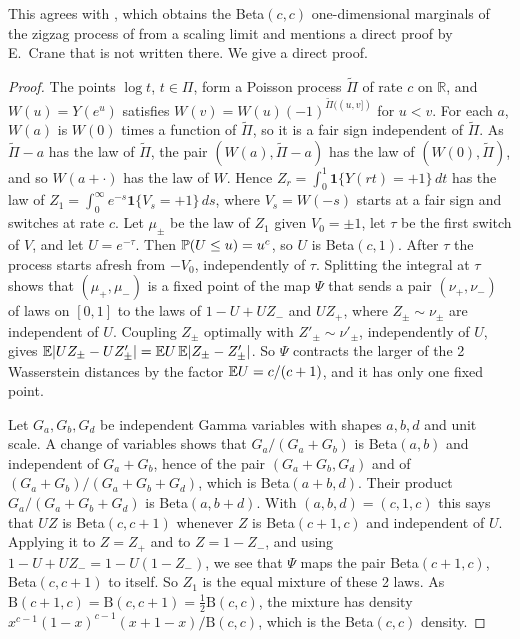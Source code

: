 This agrees with \cite[Remark~6.2]{evw2020}, which obtains the Beta$(c,c)$ one-dimensional
marginals of the zigzag process of \cite[Definition~6.1]{evw2020} from a scaling limit and
mentions a direct proof by E.~Crane that is not written there. We give a direct proof.

\begin{proof}
The points $\log t$, $t\in\Pi$, form a Poisson process $\tilde\Pi$ of rate $c$ on $\mathbb R$,
and $W(u)=Y(e^u)$ satisfies $W(v)=W(u)(-1)^{\tilde\Pi((u,v])}$ for $u<v$. For each $a$, $W(a)$
is $W(0)$ times a function of $\tilde\Pi$, so it is a fair sign independent of $\tilde\Pi$. As
$\tilde\Pi-a$ has the law of $\tilde\Pi$, the pair $(W(a),\tilde\Pi-a)$ has the law of
$(W(0),\tilde\Pi)$, and so $W(a+\cdot)$ has the law of $W$. Hence
$Z_r=\int_0^1\mathbf 1\{Y(rt)=+1\}\,dt$ has the law of
$Z_1=\int_0^\infty e^{-s}\mathbf 1\{V_s=+1\}\,ds$, where $V_s=W(-s)$ starts at a fair sign and
switches at rate $c$. Let $\mu_\pm$ be the law of $Z_1$ given $V_0=\pm1$, let $\tau$ be the
first switch of $V$, and let $U=e^{-\tau}$. Then $\mathbb{P}(U\le u)=u^c$, so $U$ is Beta$(c,1)$.
After $\tau$ the process starts afresh from $-V_0$, independently of $\tau$. Splitting the
integral at $\tau$ shows that $(\mu_+,\mu_-)$ is a fixed point of the map $\Psi$ that sends a
pair $(\nu_+,\nu_-)$ of laws on $[0,1]$ to the laws of $1-U+UZ_-$ and $UZ_+$, where
$Z_\pm\sim\nu_\pm$ are independent of $U$. Coupling $Z_\pm$ optimally with $Z'_\pm\sim\nu'_\pm$,
independently of $U$, gives $\mathbb{E}|UZ_\pm-UZ'_\pm|=\mathbb{E} U\,\mathbb{E}|Z_\pm-Z'_\pm|$. So $\Psi$ contracts the
larger of the 2 Wasserstein distances by the factor $\mathbb{E} U=c/(c+1)$, and it has only one fixed
point.

Let $G_a,G_b,G_d$ be independent Gamma variables with shapes $a,b,d$ and unit scale. A change of
variables shows that $G_a/(G_a+G_b)$ is Beta$(a,b)$ and independent of $G_a+G_b$, hence of the
pair $(G_a+G_b,G_d)$ and of $(G_a+G_b)/(G_a+G_b+G_d)$, which is Beta$(a+b,d)$. Their product
$G_a/(G_a+G_b+G_d)$ is Beta$(a,b+d)$. With $(a,b,d)=(c,1,c)$ this says that $UZ$ is
Beta$(c,c+1)$ whenever $Z$ is Beta$(c+1,c)$ and independent of $U$. Applying it to $Z=Z_+$ and
to $Z=1-Z_-$, and using $1-U+UZ_-=1-U(1-Z_-)$, we see that $\Psi$ maps the pair
Beta$(c+1,c)$, Beta$(c,c+1)$ to itself. So $Z_1$ is the equal mixture of these 2 laws. As
$\mathrm B(c+1,c)=\mathrm B(c,c+1)=\frac12\mathrm B(c,c)$, the mixture has density
$x^{c-1}(1-x)^{c-1}(x+1-x)/\mathrm B(c,c)$, which is the Beta$(c,c)$ density.
\end{proof}

